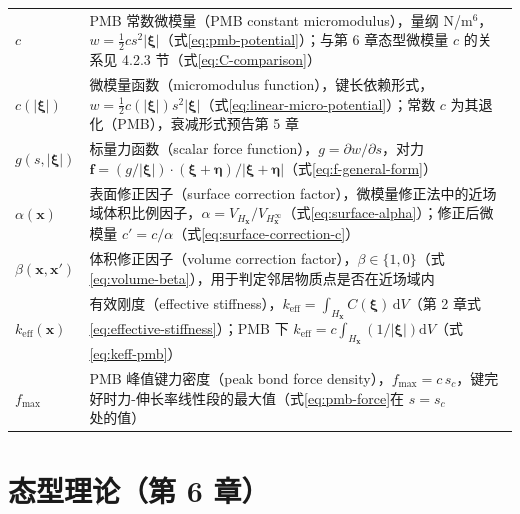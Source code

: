{\small
\begin{tabular}{@{}p{}@{}p{}@{}}
  $c$ & PMB 常数微模量（PMB constant micromodulus），量纲 N/m$^{6}$，$w=\tfrac{1}{2}c s^{2}|\boldsymbol{\xi}|$（式\eqref{eq:pmb-potential}）；与第 6 章态型微模量 $c$ 的关系见 4.2.3 节（式\eqref{eq:C-comparison}） \\
  $c(|\boldsymbol{\xi}|)$ & 微模量函数（micromodulus function），键长依赖形式，$w=\tfrac{1}{2}c(|\boldsymbol{\xi}|)s^{2}|\boldsymbol{\xi}|$（式\eqref{eq:linear-micro-potential}）；常数 $c$ 为其退化（PMB），衰减形式预告第 5 章 \\
  $g(s,|\boldsymbol{\xi}|)$ & 标量力函数（scalar force function），$g=\partial w/\partial s$，对力 $\mathbf{f}=(g/|\boldsymbol{\xi}|)\cdot(\boldsymbol{\xi}+\boldsymbol{\eta})/|\boldsymbol{\xi}+\boldsymbol{\eta}|$（式\eqref{eq:f-general-form}） \\
  $\alpha(\mathbf{x})$ & 表面修正因子（surface correction factor），微模量修正法中的近场域体积比例因子，$\alpha=V_{H_{\mathbf{x}}}/V_{H_{\mathbf{x}}^{\infty}}$（式\eqref{eq:surface-alpha}）；修正后微模量 $c'=c/\alpha$（式\eqref{eq:surface-correction-c}） \\
  $\beta(\mathbf{x},\mathbf{x}')$ & 体积修正因子（volume correction factor），$\beta\in\{1,0\}$（式\eqref{eq:volume-beta}），用于判定邻居物质点是否在近场域内 \\
  $k_{\mathrm{eff}}(\mathbf{x})$ & 有效刚度（effective stiffness），$k_{\mathrm{eff}}=\int_{H_{\mathbf{x}}} C(\boldsymbol{\xi})\,\mathrm{d}V$（第 2 章式\eqref{eq:effective-stiffness}）；PMB 下 $k_{\mathrm{eff}}=c\int_{H_{\mathbf{x}}}(1/|\boldsymbol{\xi}|)\mathrm{d}V$（式\eqref{eq:keff-pmb}） \\
  $f_{\max}$ & PMB 峰值键力密度（peak bond force density），$f_{\max}=c\,s_{c}$，键完好时力-伸长率线性段的最大值（式\eqref{eq:pmb-force}在 $s=s_{c}$ 处的值） \\
\end{tabular}
}

\section*{态型理论（第 6 章）}

